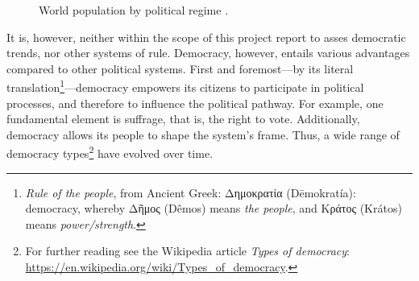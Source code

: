 \begin{figure}[H]

	\centering {}
	\caption[World population by political regime]{World population by political regime \parencite[see][]{Roser2018}.}
	\label{fig:democracy-trend}

\end{figure}

It is, however, neither within the scope of this project report to asses democratic trends, nor other systems of rule. Democracy, however, entails various advantages compared to other political systems. First and foremost---by its literal translation\footnote{\textit{Rule of the people}, from Ancient Greek: \textgreek{Δημοκρατία} (Dēmokratía): democracy, whereby \textgreek{Δῆμος} (Dêmos) means \textit{the people}, and \textgreek{Κράτος} (Krátos) means \textit{power/strength}.}---democracy empowers its citizens to participate in political processes, and therefore to influence the political pathway. For example, one fundamental element is suffrage, that is, the right to vote. Additionally, democracy allows its people to shape the system’s frame. Thus, a wide range of democracy types\footnote{For further reading see the Wikipedia article \textit{Types of democracy}: \url{https://en.wikipedia.org/wiki/Types_of_democracy}.} have evolved over time.

